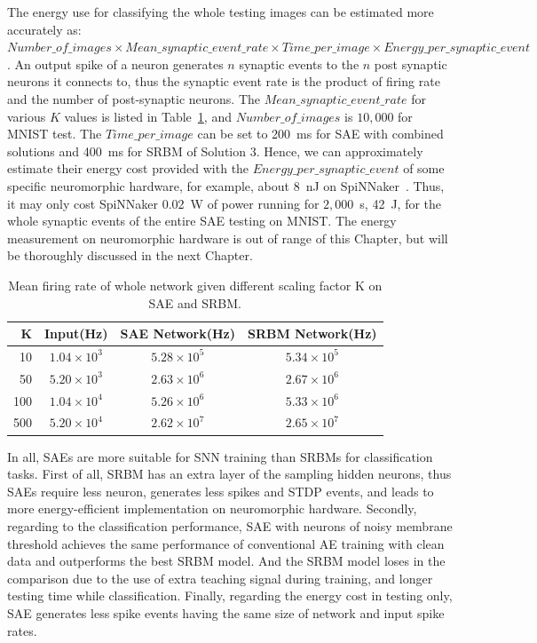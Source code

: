 The energy use for classifying the whole testing images can be estimated more accurately as: $Number\_of\_images \times Mean\_synaptic\_event\_rate \times Time\_per\_image \times Energy\_per\_synaptic\_event$.
An output spike of a neuron generates $n$ synaptic events to the $n$ post synaptic neurons it connects to, thus the synaptic event rate is the product of firing rate and the number of post-synaptic neurons.
The $Mean\_synaptic\_event\_rate$ for various $K$ values is listed in Table~\ref{tbl:fire_rate}, and $Number\_of\_images$ is $10,000$ for MNIST test.
The $Time\_per\_image$ can be set to 200~ms for SAE with combined solutions and 400~ms for SRBM of Solution 3.
Hence, we can approximately estimate their energy cost provided with the $Energy\_per\_synaptic\_event$ of some specific neuromorphic hardware, for example, about 8~nJ on SpiNNaker~\cite{stromatias2013power}.
Thus, it may only cost SpiNNaker 0.02~W of power running for $2,000$~s, 42~J, for the whole synaptic events of the entire SAE testing on MNIST.
The energy measurement on neuromorphic hardware is out of range of this Chapter, but will be thoroughly discussed in the next Chapter.
\begin{table}[htbp]
	\centering
	\caption{\label{tbl:fire_rate}Mean firing rate of whole network given different scaling factor K on SAE and SRBM.}
	\bgroup
	\def\arraystretch{1.4}
	\begin{tabular}{r c c c}
		K & Input(Hz) & SAE Network(Hz) & SRBM Network(Hz)\\
		\hline
		10 & $1.04 \times 10^3$ & $5.28 \times 10^5$ & $5.34 \times 10^5$ \\
		50 & $5.20 \times 10^3$ & $2.63 \times 10^6$ & $2.67 \times 10^6$ \\
		100 & $1.04 \times 10^4$ & $5.26 \times 10^6$ & $5.33 \times 10^6$ \\
		500 & $5.20 \times 10^4$ & $2.62 \times 10^7$ & $2.65 \times 10^7$ \\
	\end{tabular}
	\egroup
\end{table}

In all, SAEs are more suitable for SNN training than SRBMs for classification tasks.
First of all, SRBM has an extra layer of the sampling hidden neurons, thus SAEs require less neuron, generates less spikes and STDP events, and leads to more energy-efficient implementation on neuromorphic hardware.
Secondly, regarding to the classification performance, SAE with neurons of noisy membrane threshold achieves the same performance of conventional AE training with clean data and outperforms the best SRBM model.
And the SRBM model loses in the comparison due to the use of extra teaching signal during training, and longer testing time while classification.
Finally, regarding the energy cost in testing only, SAE generates less spike events having the same size of network and input spike rates.

